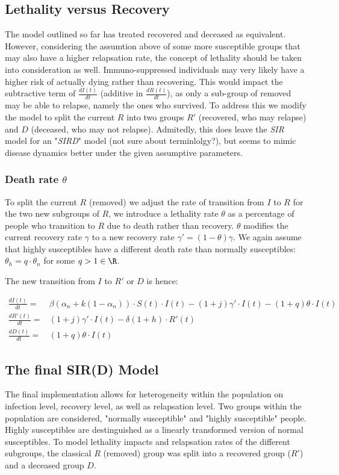 \begin{multicols}{3}
\subsection{Lethality versus Recovery}
The model outlined so far has treated recovered and deceased as equivalent. However, considering the assumtion above of some more susceptible groups that may also have a higher relapsation rate, the concept of lethality should be taken into consideration as well. Immuno-suppressed individuals may very likely have a higher risk of actually dying rather than recovering. This would impact the subtractive term of $\frac{dI(t)}{dt}$ (additive in $\frac{dR(t)}{dt}$), as only a sub-group of removed may be able to relapse, namely the ones who survived. To address this we modify the model to split the current $R$ into two groups $R'$ (recovered, who may relapse) and $D$ (deceased, who may not relapse). Admitedly, this does leave the \textit{SIR} model for an "\textit{SIRD}" model (not sure about terminlolgy?), but seems to mimic disease dynamics better under the given assumptive parameters. 

\subsubsection{Death rate $\theta$}
To split the current $R$ (removed) we adjust the rate of transition from $I$ to $R$ for the two new subgroups of $R$, we introduce a lethality rate $\theta$ as a percentage of people who transition to $R$ due to death rather than recovery. $\theta$ modifies the current recovery rate $\gamma$ to a new recovery rate $\gamma' = (1 - \theta)\gamma$. 
We again assume that highly susceptibles have a different death rate than normally susceptibles: $\theta_h = q \cdot \theta_n$ for some $q > 1 \in \R$. 


The new transition from $I$ to $R'$ or $D$ is hence: 

$$
\begin{aligned}
\frac{dI(t)}{dt} = {}&  \beta(\alpha_n  + k (1 -\alpha_n)) \cdot S(t) \cdot I(t) - (1 + j)\gamma'\cdot I(t) - (1 + q)\theta\cdot I(t) \\

\frac{dR'(t)}{dt} = {}&  (1 + j)\gamma'\cdot I(t) - \delta(1 + h) \cdot R'(t) \\

\frac{dD(t)}{dt} = {}&  (1 + q)\theta\cdot I(t)

\end{aligned}
$$


\subsection{The final SIR(D) Model}
The final implementation allows for heterogeneity within the population on infection level, recovery level, as well as relapsation level. Two groups within the population are considered, "normally susceptible" and "highly susceptible" people. Highly susceptibles are destinguished as a linearly transformed version of normal susceptibles. To model lethality impacts and relapsation rates of the different subgroups, the classical $R$ (removed) group was split into a recovered group ($R'$) and a deceased group $D$. 


\end{multicols}

